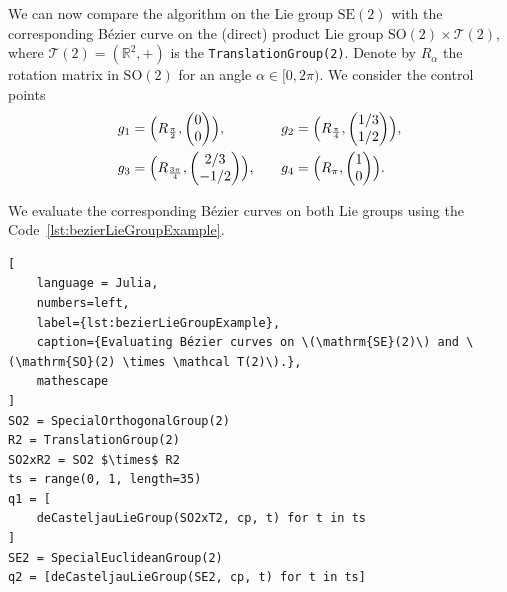 \documentclass{juliacon}
\begin{document}
We can now compare the algorithm on the Lie group \(\mathrm{SE}(2)\) with the corresponding Bézier curve on the (direct) product Lie group $\mathrm{SO}(2) \times \mathcal T(2)$, where \(\mathcal T(2) = (\mathbb{R}^2, +)\) is the \verb|TranslationGroup(2)|.
Denote by $R_\alpha$ the rotation matrix in \(\mathrm{SO}(2)\) for an angle \(\alpha\in[0,2\pi)\).
We consider the control points
\begin{align*}
    g_1 &= \Bigl(R_{\frac{\pi}{2}}, \begin{pmatrix} 0 \\ 0 \end{pmatrix}\Bigr),
    &\quad
    g_2 &= \Bigl(R_{\frac{\pi}{4}}, \begin{pmatrix} 1/3 \\ 1/2 \end{pmatrix}\Bigr),
    \\%
    g_3 &= \Bigl(R_{\frac{3\pi}{4}}, \begin{pmatrix} 2/3 \\ -1/2 \end{pmatrix}\Bigr),
    &\quad
    g_4 &= \Bigl(R_{\pi}, \begin{pmatrix} 1 \\ 0 \end{pmatrix}\Bigr).
\end{align*}

We evaluate the corresponding Bézier curves on both Lie groups using the Code~\ref{lst:bezierLieGroupExample}.
\begin{lstlisting}[
    language = Julia,
    numbers=left,
    label={lst:bezierLieGroupExample},
    caption={Evaluating Bézier curves on \(\mathrm{SE}(2)\) and \(\mathrm{SO}(2) \times \mathcal T(2)\).},
    mathescape
]
SO2 = SpecialOrthogonalGroup(2)
R2 = TranslationGroup(2)
SO2xR2 = SO2 $\times$ R2
ts = range(0, 1, length=35)
q1 = [
    deCasteljauLieGroup(SO2xT2, cp, t) for t in ts
]
SE2 = SpecialEuclideanGroup(2)
q2 = [deCasteljauLieGroup(SE2, cp, t) for t in ts]
\end{lstlisting}
\end{document}
